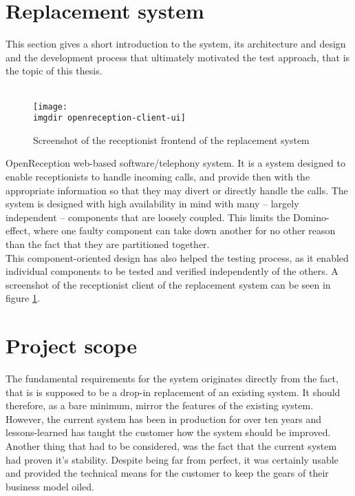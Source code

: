 \section{Replacement system}
This section gives a short introduction to the system, its architecture and design and the development process that ultimately motivated the test approach, that is the topic of this thesis.\\\\
\begin{figure}[!hbpt]
\centering
\texttt{[image: \\imgdir openreception-client-ui]}
\caption{Screenshot of the receptionist frontend of the replacement system}
\label{fig:openreception-client-ui}
\end{figure}OpenReception web-based software/telephony system. It is a system designed to enable receptionists to handle incoming calls, and provide then with the appropriate information so that they may divert or directly handle the calls. The system is designed with high availability in mind with many -- largely independent -- components that are loosely coupled. This limits the Domino-effect, where one faulty component can take down another for no other reason than the fact that they are partitioned together.\\ This component-oriented design has also helped the testing process, as it enabled individual components to be tested and verified independently of the others. A screenshot of the receptionist client of the replacement system can be seen in figure \ref{fig:openreception-client-ui}.

\section{Project scope}
The fundamental requirements for the system originates directly from the fact, that is is supposed to be a drop-in replacement of an existing system. It should therefore, as a bare minimum, mirror the features of the existing system.\\
However, the current system has been in production for over ten years and lessons-learned has taught the customer how the system should be improved. Another thing that had to be considered, was the fact that the current system had proven it's stability. Despite being far from perfect, it was certainly usable and provided the technical means for the customer to keep the gears of their business model oiled.


